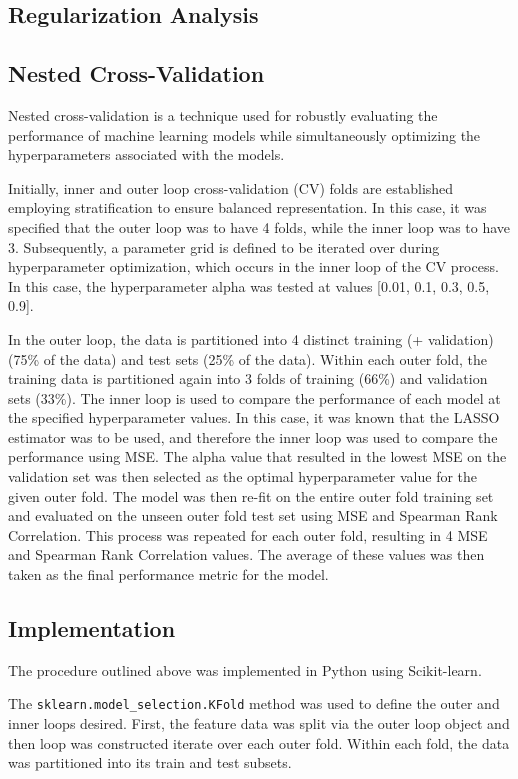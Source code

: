\documentclass[12pt]{article}
\begin{document}
\subsection{Regularization Analysis}

\subsection{Nested Cross-Validation}
Nested cross-validation is a technique used for robustly evaluating the performance of machine learning models while simultaneously optimizing the hyperparameters associated with the models. 

Initially, inner and outer loop cross-validation (CV) folds are established employing stratification to ensure balanced representation. In this case, it was specified that the outer loop was to have 4 folds, while the inner loop was to have 3. Subsequently, a parameter grid is defined to be iterated over during hyperparameter optimization, which occurs in the inner loop of the CV process. In this case, the hyperparameter alpha was tested at values [0.01, 0.1, 0.3, 0.5, 0.9].

In the outer loop, the data is partitioned into 4 distinct training (+ validation) (75\% of the data) and test sets (25\% of the data). Within each outer fold, the training data is partitioned again into 3 folds of training (66\%) and validation sets (33\%). The inner loop is used to compare the performance of each model at the specified hyperparameter values. In this case, it was known that the LASSO estimator was to be used, and therefore the inner loop was used to compare the performance using MSE. The alpha value that resulted in the lowest MSE on the validation set was then selected as the optimal hyperparameter value for the given outer fold. The model was then re-fit on the entire outer fold training set and evaluated on the unseen outer fold test set using MSE and Spearman Rank Correlation. This process was repeated for each outer fold, resulting in 4 MSE and Spearman Rank Correlation values. The average of these values was then taken as the final performance metric for the model.

\subsection{Implementation}
The procedure outlined above was implemented in Python using Scikit-learn. 

The \verb|sklearn.model_selection.KFold| method was used to define the outer and inner loops desired. First, the feature data was split via the outer loop object and then loop was constructed iterate over each outer fold. Within each fold, the data was partitioned into its train and test subsets. 
\end{document}
